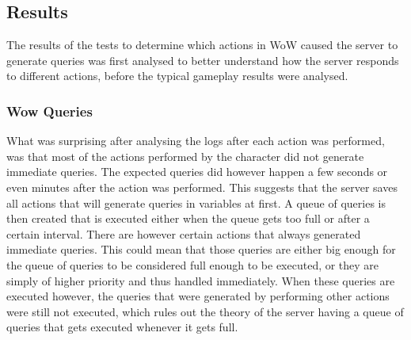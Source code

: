 %



\subsection{Results}
The results of the tests to determine which actions in WoW caused the server to generate queries was first analysed to better understand how the server responds to different actions, before the typical gameplay results were analysed.

\subsubsection{Wow Queries}

What was surprising after analysing the logs after each action was performed, was that most of the actions performed by the character did not generate immediate queries. The expected queries did however happen  a few seconds or even minutes after the action was performed. This suggests that the server saves all actions that will generate queries in variables at first. A queue of queries is then created that is executed either when the queue gets too full or after a certain interval. There are however certain actions that always generated immediate queries. This could mean that those queries are either big enough for the queue of queries to be considered full enough to be executed, or they are simply of higher priority and thus handled immediately. When these queries are executed however, the queries that were generated by performing other actions were still not executed, which rules out the theory of the server having a queue of queries that gets executed whenever it gets full.

